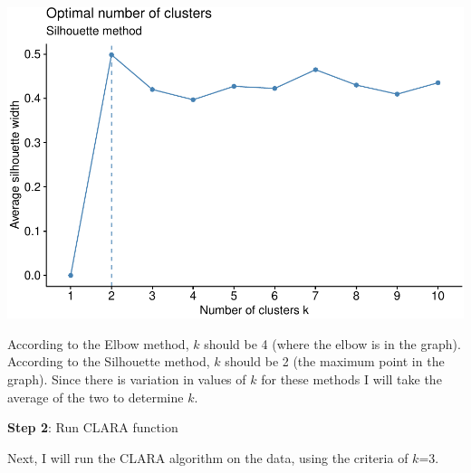 \documentclass[12pt,twoside]{amherstthesis}
\begin{document}
  \begin{center}\includegraphics{Comps_Proj_files/figure-latex/unnamed-chunk-5-2} \end{center}
  
  According to the Elbow method, \(k\) should be 4 (where the elbow is in
  the graph). According to the Silhouette method, \(k\) should be 2 (the
  maximum point in the graph). Since there is variation in values of \(k\)
  for these methods I will take the average of the two to determine \(k\).
  
  \textbf{Step 2}: Run CLARA function
  
  Next, I will run the CLARA algorithm on the data, using the criteria of
  \(k\)=3.
  
  \begin{Shaded}
  \begin{Highlighting}[]
  \StringTok{ }\NormalTok{(new[}\OperatorTok{:}\NormalTok{], }\NormalTok{)}
  \end{Highlighting}
  \end{Shaded}
  
  \begin{Shaded}
  \begin{Highlighting}[]
  \end{Highlighting}
  \end{Shaded}
  
\end{document}
